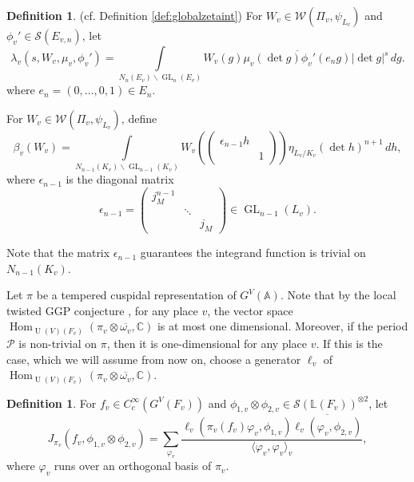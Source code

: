 \documentclass[11pt, reqno]{amsart}
\numberwithin{equation}{subsection}
\theoremstyle{plain}
\theoremstyle{definition}
\newtheorem{definition}[proposition]{Definition}
\newcommand{\bs}{\backslash}
\newcommand{\BC}{\mathbb C}
\newcommand{\LL}{\mathbb L}
\newcommand{\ol}{\overline}
\newcommand{\cS}{\mathcal S}
\newcommand{\W}{\mathcal W}
\DeclareMathOperator{\GL}{GL}
\DeclareMathOperator{\Hom}{Hom}
\DeclareMathOperator{\U}{U}
\begin{document}
\begin{definition}(cf. Definition \ref{def:globalzetaint}) 
For $W_v \in \W(\Pi_v, \psi_{L_v})$ and $\phi_v' \in \cS(E_{v,n})$, let
\begin{equation}
\lambda_v(s, W_v, \mu_v, \phi_v')
    = \int\limits_{N_n(E_v)\bs \GL_n(E_v)} W_v(g)
    \ol{\mu_v(\det g) \phi_v'(e_n g)} \lvert \det g \rvert^s\, dg.   
\end{equation}
where $e_n = (0,\dots, 0, 1) \in E_n$.

For $W_v \in \W(\Pi_v, \psi_{L_v})$, define 
\begin{equation}
    \beta_v(W_v) = \int\limits_{N_{n-1}(K_v)\bs 
    \GL_{n-1}(K_v)}
    W_v\left(\begin{pmatrix}
    \epsilon_{n-1} h & \\ & 1 \end{pmatrix}\right)
    \eta_{L_v/K_v}(\det h)^{n+1}\, dh,
\end{equation}
where $\epsilon_{n-1}$ is the diagonal matrix
\[
    \epsilon_{n-1} = \begin{pmatrix}
        j_M^{n-1} & & \\ & \ddots & \\ & & j_M
    \end{pmatrix} 
    \in \GL_{n-1}(L_v).
\]
\end{definition}
Note that the matrix $\epsilon_{n-1}$ guarantees the integrand function is trivial on $N_{n-1}(K_v)$. 


Let $\pi$ be a tempered cuspidal representation of $G^V(\mathbb A)$. Note that by the local twisted GGP conjecture \cite{le2025local}, for any place $v$, the vector space $\Hom_{\U(V)(F_v)}(\pi_v \otimes \ol{\omega_v}, \BC)$ is at most one dimensional. Moreover, if the period $\mathcal{P}$ is non-trivial on $\pi$, then it is one-dimensional for any place $v$. If this is the case, which we will assume from now on, 
choose a generator $\ell_v$ of $\Hom_{\U(V)(F_v)}(\pi_v \otimes \ol{\omega_v}, \BC)$.


\begin{definition}
    For $f_v \in C_c^\infty(G^V(F_v))$ and $\phi_{1,v} \otimes \phi_{2,v} \in \cS(\LL(F_v))^{\otimes 2}$, let
    \[
        J_{\pi_v}(f_v, \phi_{1,v} \otimes \phi_{2,v})
        = \sum_{\varphi_v} \frac{\ell_v(\pi_v(f_v)\varphi_v, \phi_{1,v})\ol{\ell_v(\varphi_v, \phi_{2,v})}}
        {\langle \varphi_v, \varphi_v \rangle_v},
    \]
    where $\varphi_v$ runs over an orthogonal basis of $\pi_v$.
\end{definition}
\end{document}
